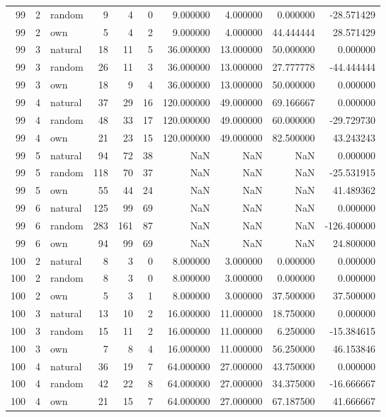 \begin{table}[htbp]
\begin{tabular}{rrlrrrrrrr}
99 & 2 & random & 9 & 4 & 0 & 9.000000 & 4.000000 & 0.000000 & -28.571429 \\
99 & 2 & own & 5 & 4 & 2 & 9.000000 & 4.000000 & 44.444444 & 28.571429 \\
99 & 3 & natural & 18 & 11 & 5 & 36.000000 & 13.000000 & 50.000000 & 0.000000 \\
99 & 3 & random & 26 & 11 & 3 & 36.000000 & 13.000000 & 27.777778 & -44.444444 \\
99 & 3 & own & 18 & 9 & 4 & 36.000000 & 13.000000 & 50.000000 & 0.000000 \\
99 & 4 & natural & 37 & 29 & 16 & 120.000000 & 49.000000 & 69.166667 & 0.000000 \\
99 & 4 & random & 48 & 33 & 17 & 120.000000 & 49.000000 & 60.000000 & -29.729730 \\
99 & 4 & own & 21 & 23 & 15 & 120.000000 & 49.000000 & 82.500000 & 43.243243 \\
99 & 5 & natural & 94 & 72 & 38 & NaN & NaN & NaN & 0.000000 \\
99 & 5 & random & 118 & 70 & 37 & NaN & NaN & NaN & -25.531915 \\
99 & 5 & own & 55 & 44 & 24 & NaN & NaN & NaN & 41.489362 \\
99 & 6 & natural & 125 & 99 & 69 & NaN & NaN & NaN & 0.000000 \\
99 & 6 & random & 283 & 161 & 87 & NaN & NaN & NaN & -126.400000 \\
99 & 6 & own & 94 & 99 & 69 & NaN & NaN & NaN & 24.800000 \\
100 & 2 & natural & 8 & 3 & 0 & 8.000000 & 3.000000 & 0.000000 & 0.000000 \\
100 & 2 & random & 8 & 3 & 0 & 8.000000 & 3.000000 & 0.000000 & 0.000000 \\
100 & 2 & own & 5 & 3 & 1 & 8.000000 & 3.000000 & 37.500000 & 37.500000 \\
100 & 3 & natural & 13 & 10 & 2 & 16.000000 & 11.000000 & 18.750000 & 0.000000 \\
100 & 3 & random & 15 & 11 & 2 & 16.000000 & 11.000000 & 6.250000 & -15.384615 \\
100 & 3 & own & 7 & 8 & 4 & 16.000000 & 11.000000 & 56.250000 & 46.153846 \\
100 & 4 & natural & 36 & 19 & 7 & 64.000000 & 27.000000 & 43.750000 & 0.000000 \\
100 & 4 & random & 42 & 22 & 8 & 64.000000 & 27.000000 & 34.375000 & -16.666667 \\
100 & 4 & own & 21 & 15 & 7 & 64.000000 & 27.000000 & 67.187500 & 41.666667 \\

\end{tabular}
\end{table}
